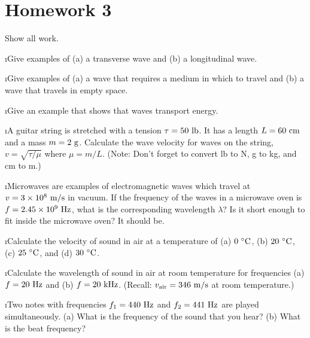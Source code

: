 \section{Homework 3}

\noindent
Show all work.

\ben
\i Give examples of 
(a) a transverse wave 
and 
(b) a longitudinal wave.

\i Give examples of 
(a) a wave that requires a medium in which to travel and 
(b) a wave that travels in empty space.

\i Give an example that shows that waves transport energy.

\i A guitar string is stretched with a tension $\tau=50~{\rm lb}$.
It has a length $L=60~{\rm cm}$ and a mass $m=2~{\rm g}$.
Calculate the wave velocity for waves on the string, $v=\sqrt{\tau/\mu}$
where $\mu=m/L$.
(Note: Don't forget to convert lb to N, g to kg, and cm to m.)

\i Microwaves are examples of electromagnetic waves
which travel at 
$v=3\times 10^8~{\rm m/s}$ in vacuum.
If the frequency of the waves in a microwave oven
is $f=2.45\times 10^9~{\rm Hz}$, what is the corresponding
wavelength $\lambda$?
Is it short enough to fit inside the microwave
oven?
It should be.

\i Calculate the velocity of sound in air at a temperature of
(a)  $0~{}^\circ {\rm C}$,
(b) $20~{}^\circ {\rm C}$,
(c) $25~{}^\circ {\rm C}$, and
(d) $30~{}^\circ {\rm C}$.

\i Calculate the wavelength of sound in air at room temperature
for frequencies
(a) $f=20~{\rm Hz}$ and 
(b) $f=20~{\rm kHz}$.
(Recall: $v_{\rm air} = 346~{\rm m/s}$ at room temperature.)

\i Two notes with frequencies $f_1=440~{\rm Hz}$
and $f_2=441~{\rm Hz}$ are played simultaneously.
(a) What is the frequency of the sound that you hear?
(b) What is the beat frequency?

